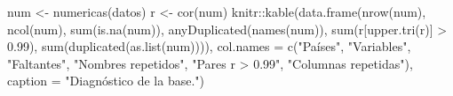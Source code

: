 \documentclass[oneside, openany, fontset=libertinus]{mitthesis}
\newenvironment{Shaded}{\begin{snugshade}}{\end{snugshade}}
\newcommand{\AttributeTok}[1]{\textcolor[rgb]{0.40,0.45,0.13}{#1}}
\newcommand{\FloatTok}[1]{\textcolor[rgb]{0.68,0.00,0.00}{#1}}
\newcommand{\FunctionTok}[1]{\textcolor[rgb]{0.28,0.35,0.67}{#1}}
\newcommand{\NormalTok}[1]{\textcolor[rgb]{0.00,0.23,0.31}{#1}}
\newcommand{\OtherTok}[1]{\textcolor[rgb]{0.00,0.23,0.31}{#1}}
\newcommand{\SpecialCharTok}[1]{\textcolor[rgb]{0.37,0.37,0.37}{#1}}
\newcommand{\StringTok}[1]{\textcolor[rgb]{0.13,0.47,0.30}{#1}}
\begin{document}
\begin{Shaded}
\begin{Highlighting}[]
\NormalTok{num }\OtherTok{\textless{}{-}} \FunctionTok{numericas}\NormalTok{(datos)}
\NormalTok{r }\OtherTok{\textless{}{-}} \FunctionTok{cor}\NormalTok{(num)}
\NormalTok{knitr}\SpecialCharTok{::}\FunctionTok{kable}\NormalTok{(}\FunctionTok{data.frame}\NormalTok{(}\FunctionTok{nrow}\NormalTok{(num), }\FunctionTok{ncol}\NormalTok{(num), }\FunctionTok{sum}\NormalTok{(}\FunctionTok{is.na}\NormalTok{(num)),}
                        \FunctionTok{anyDuplicated}\NormalTok{(}\FunctionTok{names}\NormalTok{(num)),}
                        \FunctionTok{sum}\NormalTok{(r[}\FunctionTok{upper.tri}\NormalTok{(r)] }\SpecialCharTok{\textgreater{}} \FloatTok{0.99}\NormalTok{),}
                        \FunctionTok{sum}\NormalTok{(}\FunctionTok{duplicated}\NormalTok{(}\FunctionTok{as.list}\NormalTok{(num)))),}
             \AttributeTok{col.names =} \FunctionTok{c}\NormalTok{(}\StringTok{"Países"}\NormalTok{, }\StringTok{"Variables"}\NormalTok{, }\StringTok{"Faltantes"}\NormalTok{,}
                           \StringTok{"Nombres repetidos"}\NormalTok{, }\StringTok{"Pares r \textgreater{} 0.99"}\NormalTok{,}
                           \StringTok{"Columnas repetidas"}\NormalTok{),}
             \AttributeTok{caption =} \StringTok{"Diagnóstico de la base."}\NormalTok{)}
\end{Highlighting}
\end{Shaded}

\Needspace{1.36in}
\end{document}
